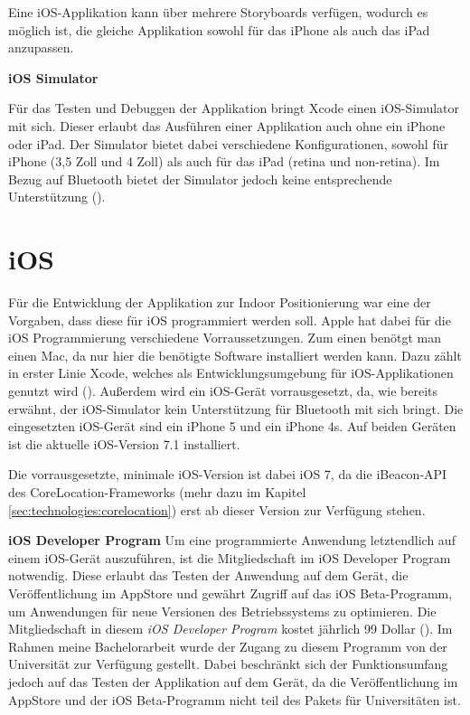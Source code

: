 Eine iOS-Applikation kann über mehrere Storyboards verfügen, wodurch es möglich ist, die gleiche Applikation sowohl für das iPhone als auch das iPad anzupassen.


\textbf{iOS Simulator}

Für das Testen und Debuggen der Applikation bringt Xcode einen iOS-Simulator mit sich. Dieser erlaubt das Ausführen einer Applikation auch ohne ein iPhone oder iPad. Der Simulator bietet dabei verschiedene Konfigurationen, sowohl für iPhone (3,5 Zoll und 4 Zoll) als auch für das iPad (retina und non-retina).
Im Bezug auf Bluetooth bietet der Simulator jedoch keine entsprechende Unterstützung (\citet{iossimulator}).

\section{iOS}
\label{sec:technologies:iosandxcode}
Für die Entwicklung der Applikation zur Indoor Positionierung war eine der Vorgaben, dass diese für iOS programmiert werden soll.
Apple hat dabei für die iOS Programmierung verschiedene Vorraussetzungen. Zum einen benötgt man einen Mac, da nur hier die benötigte Software installiert werden kann.
Dazu zählt in erster Linie Xcode, welches als Entwicklungsumgebung für iOS-Applikationen genutzt wird (\citet{iossetup}). 
Außerdem wird ein iOS-Gerät vorrausgesetzt, da, wie bereits erwähnt, der iOS-Simulator kein Unterstützung für Bluetooth mit sich bringt. 
Die eingesetzten iOS-Gerät sind ein iPhone 5 und ein iPhone 4s. Auf beiden Geräten ist die aktuelle iOS-Version 7.1 installiert.

Die vorrausgesetzte, minimale iOS-Version ist dabei iOS 7, da die iBeacon-API des CoreLocation-Frameworks (mehr dazu im Kapitel \ref{sec:technologies:corelocation}) erst ab dieser Version zur Verfügung stehen.

\textbf{iOS Developer Program}
Um eine programmierte Anwendung letztendlich auf einem iOS-Gerät auszuführen, ist die Mitgliedschaft im iOS Developer Program notwendig.
Diese erlaubt das Testen der Anwendung auf dem Gerät, die Veröffentlichung im AppStore und gewährt Zugriff auf das iOS Beta-Programm, um Anwendungen für neue Versionen des Betriebssystems zu optimieren.
Die Mitgliedschaft in diesem \emph{iOS Developer Program} kostet jährlich 99 Dollar (\citet{iosdevprog}). 
Im Rahmen meine Bachelorarbeit wurde der Zugang zu diesem Programm von der Universität zur Verfügung gestellt. Dabei beschränkt sich der Funktionsumfang jedoch auf das Testen der Applikation auf dem Gerät, da die Veröffentlichung im AppStore und der iOS Beta-Programm nicht teil des Pakets für Universitäten ist.

